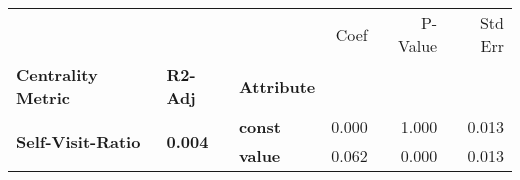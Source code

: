 \begin{tabular}{lllrrr}
\toprule
                 &       &       &  Coef &  P-Value &  Std Err \\
\textbf{Centrality Metric} & \textbf{R2-Adj} & \textbf{Attribute} &       &          &          \\
\midrule
\multirow{2}{*}{\textbf{Self-Visit-Ratio}} & \multirow{2}{*}{\textbf{0.004}} & \textbf{const} & 0.000 &    1.000 &    0.013 \\
                 &       & \textbf{value} & 0.062 &    0.000 &    0.013 \\
\bottomrule
\end{tabular}

